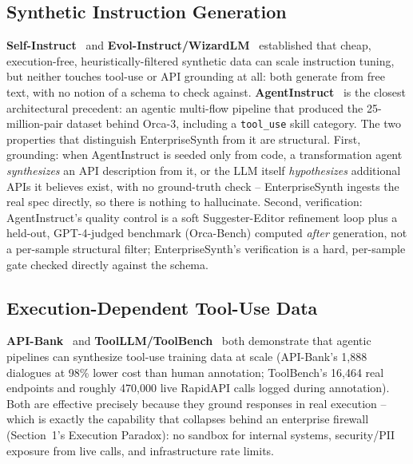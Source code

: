 \documentclass[letterpaper]{article} %
\begin{document}
\subsection{Synthetic Instruction Generation}
\textbf{Self-Instruct}~\cite{wang2022selfinstruct} and \textbf{Evol-Instruct/WizardLM}~\cite{xu2023wizardlm}
established that cheap, execution-free, heuristically-filtered synthetic data can scale instruction
tuning, but neither touches tool-use or API grounding at all: both generate from free text, with no
notion of a schema to check against. \textbf{AgentInstruct}~\cite{mitra2024agentinstruct} is the
closest architectural precedent: an agentic multi-flow pipeline that produced the 25-million-pair
dataset behind Orca-3, including a \texttt{tool\_use} skill category. The two properties that
distinguish EnterpriseSynth from it are structural. First, grounding: when AgentInstruct is seeded
only from code, a transformation agent \textit{synthesizes} an API description from it, or the LLM
itself \textit{hypothesizes} additional APIs it believes exist, with no ground-truth check --
EnterpriseSynth ingests the real spec directly, so there is nothing to hallucinate. Second,
verification: AgentInstruct's quality control is a soft Suggester-Editor refinement loop plus a
held-out, GPT-4-judged benchmark (Orca-Bench) computed \textit{after} generation, not a per-sample
structural filter; EnterpriseSynth's verification is a hard, per-sample gate checked directly
against the schema.

\subsection{Execution-Dependent Tool-Use Data}
\textbf{API-Bank}~\cite{li2023apibank} and \textbf{ToolLLM/ToolBench}~\cite{qin2023toolbench} both
demonstrate that agentic pipelines can synthesize tool-use training data at scale (API-Bank's
1,888 dialogues at 98\% lower cost than human annotation; ToolBench's 16,464 real endpoints and
roughly 470,000 live RapidAPI calls logged during annotation). Both are effective precisely
because they ground responses in real execution -- which is exactly the capability that collapses
behind an enterprise firewall (Section~1's Execution Paradox): no sandbox for internal systems,
security/PII exposure from live calls, and infrastructure rate limits.
\end{document}
